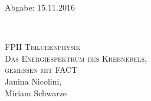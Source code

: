 



\begin{titlepage}
  \begin{flushleft}
 Abgabe: 15.11.2016
  \end{flushleft}


\HRule\\[1,0cm]

 \begin{center}


\textsc{\LARGE FPII Teilchenphysik}\\[1.5cm]
\textsc{\huge Das Energiespektrum des Krebnebels,\\ gemessen mit FACT} \\[5,5cm]

Janina Nicolini\footnotemark[1], \\
Miriam Schwarze\footnotemark[2] \\[1,0cm]



 \end{center}
\HRule

 \vfill

\end{titlepage}



\newpage



\printbibliography



